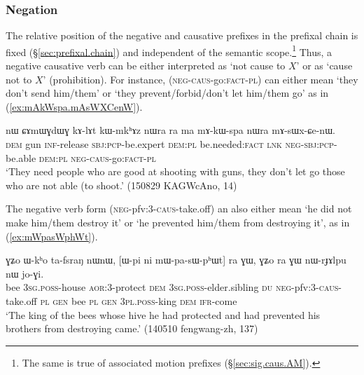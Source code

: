  

\subsubsection{Negation} \label{sec:sig.caus.negation}
The relative position of the negative and causative prefixes in the prefixal chain is fixed (§\ref{sec:prefixal.chain}) and independent of the semantic scope.\footnote{The same is true of associated motion prefixes (§\ref{sec:sig.caus.AM}). } Thus, a negative causative verb can be either  interpreted as `not cause to $X$' or as `cause not to $X$' (prohibition).   For instance,  (\textsc{neg}-\textsc{caus}-go:\textsc{fact}-\textsc{pl}) can either mean `they don't send him/them' or `they prevent/forbid/don't let him/them go' as in (\ref{ex:mAkWspa.mAsWXCenW}).
 
\begin{exe}
\ex \label{ex:mAkWspa.mAsWXCenW}
\gll nɯ ɕɤmɯɣdɯɣ kɤ-lɤt kɯ-mkʰɤz nɯra ra ma mɤ-kɯ-spa nɯra mɤ-sɯx-ɕe-nɯ. \\
\textsc{dem} gun \textsc{inf}-release \textsc{sbj}:\textsc{pcp}-be.expert \textsc{dem}:\textsc{pl} be.needed:\textsc{fact} \textsc{lnk} \textsc{neg}-\textsc{sbj}:\textsc{pcp}-be.able \textsc{dem}:\textsc{pl} \textsc{neg}-\textsc{caus}-go:\textsc{fact}-\textsc{pl} \\
\glt `They need people who are good at shooting with guns, they don't let go those who are not able (to shoot.' (150829 KAGWcAno, 14)
\end{exe}
 
The negative verb form  (\textsc{neg}-pfv:3\flobv{}-\textsc{caus}-take.off) an also either mean `he did not make him/them destroy it' or `he prevented him/them from destroying it', as in (\ref{ex:mWpasWphWt}).

\begin{exe}
\ex \label{ex:mWpasWphWt}
\gll ɣʑo ɯ-kʰo ta-fsraŋ nɯnɯ, [ɯ-pi ni mɯ-pa-sɯ-pʰɯt] ra ɣɯ, ɣʑo ra ɣɯ nɯ-rɟɤlpu nɯ jo-ɣi. \\
bee \textsc{3sg}.\textsc{poss}-house \textsc{aor}:3\flobv{}-protect \textsc{dem} \textsc{3sg}.\textsc{poss}-elder.sibling \textsc{du} \textsc{neg}-pfv:3\flobv{}-\textsc{caus}-take.off \textsc{pl} \textsc{gen} bee \textsc{pl} \textsc{gen} \textsc{3pl}.\textsc{poss}-king \textsc{dem} \textsc{ifr}-come \\
\glt `The king of the bees whose hive he had protected and had prevented his brothers from destroying came.' (140510 fengwang-zh, 137)
\end{exe}

